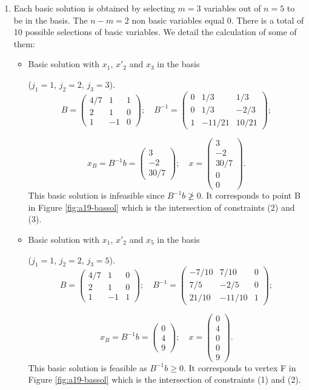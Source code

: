\begin{enumerate}
\item   Each basic solution is obtained by selecting $m=3$ variables out of $n=5$ to be in the basis.
The $n-m=2$ non basic variables equal  0.
There is a total of 10 possible selections of basic variables. We
detail the calculation of some of them:
\begin{itemize}
\item Basic solution with $x_1$, $x'_2$ and $x_3$ in the basis

 ($j_1=1$, $j_2=2$, $j_3=3$).
$$B=
\begin{pmatrix} 
4/7 & 1 & 1 \\
2 & 1 & 0\\
1 & -1 & 0
\end{pmatrix};
\quad
B^{-1}=
\begin{pmatrix} 
0 & 1/3 & 1/3 \\
0 & 1/3 & -2/3 \\
1 & -11/21 & 10/21
\end{pmatrix};
$$

$$
x_B = B^{-1}b=
\begin{pmatrix} 
3  \\
-2 \\
30/7  
\end{pmatrix};
\quad
x=
\begin{pmatrix} 
3  \\
-2 \\
30/7\\
0\\
0 
\end{pmatrix}.
$$ 
This basic solution is infeasible since $ B^{-1}b  \ngeq 0$. It corresponds to point B in Figure  \ref{fig:a19-bassol} 
which is the intersection of constraints (2) and (3).


\item Basic solution with $x_1$, $x'_2$ and $x_5$ in the basis 

($j_1=1$, $j_2=2$, $j_3=5$).
$$B=
\begin{pmatrix} 
4/7 & 1 & 0 \\
2 & 1 & 0\\
1 & -1 & 1
\end{pmatrix};
\quad
B^{-1}=
\begin{pmatrix} 
-7/10 & 7/10 & 0 \\
7/5 & -2/5 & 0 \\
21/10 & -11/10 & 1 
\end{pmatrix};
$$

$$
x_B = B^{-1}b=
\begin{pmatrix} 
0  \\
4 \\
9  
\end{pmatrix};
\quad
x=
\begin{pmatrix} 
0  \\
4 \\
0  \\
0\\
9 
\end{pmatrix}.
$$  
This basic solution is feasible as $ B^{-1}b  \geq 0$. It corresponds to vertex F in Figure  \ref{fig:a19-bassol}
which is the intersection of constraints (1) and (2).


\end{itemize}
\end{enumerate}
